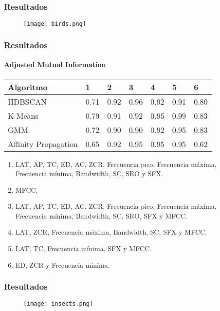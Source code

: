 \begin{frame}
    \frametitle{Resultados}

    \begin{figure}[!h]
        \centering
        \texttt{[image: birds.png]}
    \end{figure}

\end{frame}

\begin{frame}
    \frametitle{Resultados}
    \framesubtitle{Adjusted Mutual Information}

    \begin{table}[H]
        \centering
        \begin{tabular}{lllllll}
            \hline
            Algoritmo & 1 & 2 & 3 & 4 & 5 & 6  \\ \hline
            HDBSCAN & 0.71 & 0.92 & 0.96 & 0.92 & 0.91 & 0.80 \\
            K-Means & 0.79 & 0.91 & 0.92 & 0.95 & \cellcolor[HTML]{FFFC9E}0.99 & 0.83 \\
            GMM & 0.72 & 0.90 & 0.90 & 0.92 & 0.95 & 0.83 \\
            Affinity Propagation & 0.65 & 0.92 & 0.95 & 0.95 & 0.95 & 0.62
        \end{tabular}
    \end{table}

    {\tiny
    \begin{enumerate}
        \item LAT, AP, TC, ED, AC, ZCR, Frecuencia pico, Frecuencia máxima, Frecuencia mínima, Bandwidth, SC, SRO y SFX\@. %
        \item MFCC\@. %
        \item LAT, AP, TC, ED, AC, ZCR, Frecuencia pico, Frecuencia máxima, Frecuencia mínima, Bandwidth, SC, SRO, SFX y MFCC\@.
        \item LAT, ZCR, Frecuencia máxima, Bandwidth, SC, SFX y MFCC\@. %
        \item LAT, TC, Frecuencia mínima, SFX y MFCC\@. %
        \item ED, ZCR y Frecuencia mínima.
    \end{enumerate}
    }

\end{frame}

\begin{frame}
    \frametitle{Resultados}

    \begin{figure}[!h]
        \centering
        \texttt{[image: insects.png]}
    \end{figure}

\end{frame}

